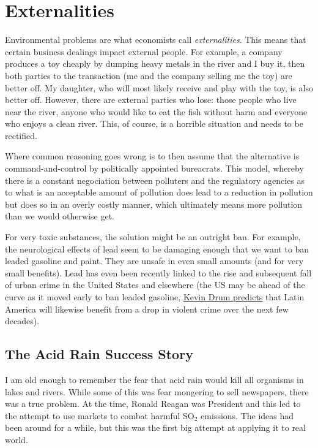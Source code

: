 \section{Externalities}

Environmental problems are what economists call \emph{externalities}. This
means that certain business dealings impact external people. For example, a
company produces a toy cheaply by dumping heavy metals in the river and I buy
it, then both parties to the transaction (me and the company selling me the
toy) are better off. My daughter, who will most likely receive and play with
the toy, is also better off. However, there are external parties who lose:
those people who live near the river, anyone who would like to eat the fish
without harm and everyone who enjoys a clean river. This, of course, is a
horrible situation and needs to be rectified.

Where common reasoning goes wrong is to then assume that the alternative is
command-and-control by politically appointed bureacrats. This model, whereby
there is a constant negociation between polluters and the regulatory agencies
as to what is an acceptable amount of pollution does lead to a reduction in
pollution but does so in an overly costly manner, which ultimately means more
pollution than we would otherwise get.

For very toxic substances, the solution might be an outright ban. For example,
the neurological effects of lead seem to be damaging enough that we want to ban
leaded gasoline and paint. They are unsafe in even small amounts (and for very
small benefits). Lead has even been recently linked to the rise and subsequent
fall of urban crime in the United States and elsewhere (the US may be ahead of
the curve as it moved early to ban leaded gasoline,
\href{http://www.motherjones.com/kevin-drum/2013/01/lead-and-crime-ill-be-melissa-harris-perry-show-sunday-10-am}{Kevin
Drum predicts} that Latin America will likewise benefit from a drop in violent
crime over the next few decades).

\subsection{The Acid Rain Success Story}

I am old enough to remember the fear that acid rain would kill all organisms in
lakes and rivers. While some of this was fear mongering to sell newspapers,
there was a true problem. At the time, Ronald Reagan was President and this led
to the attempt to use markets to combat harmful SO${}_2$ emissions. The ideas
had been around for a while, but this was the first big attempt at applying it
to real world.

